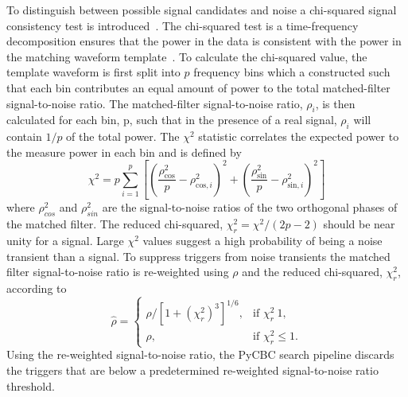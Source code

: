 To distinguish between possible signal candidates and noise a chi-squared signal consistency test is introduced~\cite{Allen:2005fk, Usman:2015kfa}. The chi-squared test is a time-frequency decomposition ensures that the power in the data is consistent with the power in the matching waveform template~\cite{Allen:2004gu}. To calculate the chi-squared value, the template waveform is first split into $p$ frequency bins which a constructed such that each bin contributes an equal amount of power to the total matched-filter signal-to-noise ratio. The matched-filter signal-to-noise ratio, $\rho_i$, is then calculated for each bin, p, such that in the presence of a real signal, $\rho_i$ will contain $1/p$ of the total power. The $\chi^2$ statistic correlates the expected power to the measure power in each bin and is defined by 
\begin{equation}
    \chi^{2}=p \sum_{i=1}^{p}\left[\left(\frac{\rho_{\mathrm{cos}}^{2}}{p}-\rho_{\mathrm{cos}, i}^{2}\right)^{2}+\left(\frac{\rho_{\mathrm{sin}}^{2}}{p}-\rho_{\mathrm{sin}, i}^{2}\right)^{2}\right]
\end{equation}
where $\rho_{cos}^2$ and $\rho_{sin}^2$ are the signal-to-noise ratios of the two orthogonal phases of the matched filter. The reduced chi-squared, $\chi_r^2 = \chi^2/(2p-2)$ should be near unity for a signal. Large $\chi^2$ values suggest a high probability of being a noise transient than a signal. To suppress triggers from noise transients the matched filter signal-to-noise ratio is re-weighted using $\rho$ and the reduced chi-squared, $\chi_r^2$,~\cite{Babak:2012zx} according to
\begin{equation}
    \hat{\rho} = \begin{cases}
        \rho/[1+(\chi_r^2)^3]^{1/6}, & \text{if } \chi_r^2 \> 1,\\
        \rho, & \text{if } \chi_r^2 \leq 1.
    \end{cases}
\end{equation}
Using the re-weighted signal-to-noise ratio, the PyCBC search pipeline discards the triggers that are below a predetermined re-weighted signal-to-noise ratio threshold.

